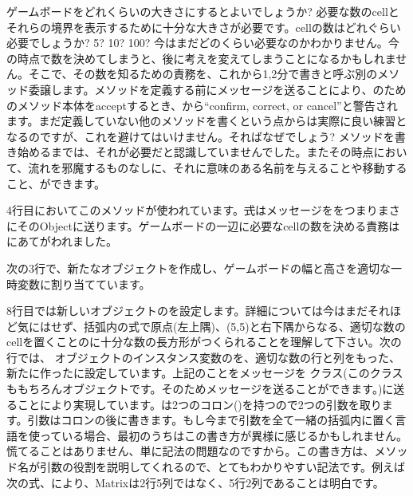 \documentclass[a4paper,10pt,twoside]{book}
\begin{document}
ゲームボードをどれくらいの大きさにするとよいでしょうか? 必要な数のcellとそれらの境界を表示するために十分な大きさが必要です。cellの数はどれぐらい必要でしょうか? 5? 10? 100? 今はまだどのくらい必要なのかわかりません。今の時点で数を決めてしまうと、後に考えを変えてしまうことになるかもしれません。そこで、その数を知るための責務を、これから1,2分で書きと呼ぶ別のメソッド委譲します。メソッドを定義する前にメッセージを送ることにより、のためのメソッド本体をacceptするとき、\pharo から``confirm, correct, or cancel''と警告されます。まだ定義していない他のメソッドを書くという点からは実際に良い練習となるのですが、これを避けてはいけません。そればなぜでしょう? 
メソッドを書き始めるまでは、それが必要だと認識していませんでした。またその時点において、流れを邪魔するものなしに、それに意味のある名前を与えることや移動すること、ができます。

 
4行目においてこのメソッドが使われています。\st 式はメッセージををつまりまさにそのObjectに送ります。ゲームボードの一辺に必要なcellの数を決める責務はにあてがわれました。

次の3行で、新たなオブジェクトを作成し、ゲームボードの幅と高さを適切な一時変数に割り当てています。 

8行目では新しいオブジェクトのを設定します。詳細については今はまだそれほど気にはせず、括弧内の式で原点(\ie 左上隅)、(5,5)と右下隅からなる、適切な数のcellを置くことのに十分な数の長方形がつくられることを理解して下さい。次の行では、 オブジェクトのインスタンス変数のを、適切な数の行と列をもった、新たに作ったに設定しています。上記のことをメッセージを クラス(このクラスももちろんオブジェクトです。そのためメッセージを送ることができます。)に送ることにより実現しています。は2つのコロン(\ct{:})を持つので2つの引数を取ります。引数はコロンの後に書きます。もし今まで引数を全て一緒の括弧内に置く言語を使っている場合、最初のうちはこの書き方が異様に感じるかもしれません。慌てることはありません、単に記法の問題なのですから。この書き方は、メソッド名が引数の役割を説明してくれるので、とてもわかりやすい記法です。例えば次の式、により、Matrixは2行5列ではなく、5行2列であることは明白です。
\end{document}
